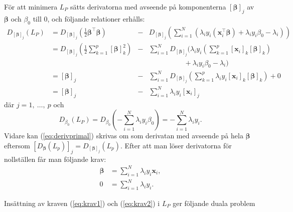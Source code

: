 \documentclass[a4paper, 12pt]{report}
\theoremstyle{definition}
\theoremstyle{remark}
\newcommand{\bfbeta}{{\boldsymbol{\beta}}}
\newcommand{\bfx}{\mathbf{x}}
\begin{document}
För att minimera $L_P$ sätts derivatorna med avseende på komponenterna $\left[\bfbeta\right]_j$ av $\bfbeta$ och $\beta_0$ till 0, och följande relationer erhålls:
\begin{equation}\label{eq:derivprimal}
\begin{aligned}
	D_{ \left[\bfbeta\right]_j } \left(L_P\right) &= D_{ \left[\bfbeta\right]_j } \left( \frac{1}{2} \bfbeta^\intercal \bfbeta \right) &- &D_{ \left[\bfbeta\right]_j } \left( \sum_{i=1}^{N} \left( \lambda_i y_i \left( \bfx_i^\intercal\bfbeta \right) + \lambda_i y_i \beta_0 - \lambda_i \right)\right)\\
	&= D_{ \left[\bfbeta\right]_j } \left( \frac{1}{2} \sum_{k=1}^{p} \left[\bfbeta\right]_k^2 \right)
	&- &\sum_{i=1}^{N} D_{ \left[\bfbeta\right]_j }
	\Big(  \lambda_i y_i \left( \sum_{k=1}^{p} \left[\mathbf{x}_i\right]_k \left[ \bfbeta \right]_k \right)\\
	& & &\qquad\qquad\quad+ \lambda_i y_i \beta_0-\lambda_i \Big)\\
	&= [\bfbeta]_j &- &\sum_{i=1}^{N} D_{ \left[\bfbeta\right]_j } \left( \sum_{k=1}^{p} \lambda_i y_i \left[\mathbf{x}_i\right]_k\left[\bfbeta\right]_k \right) + 0\\
	&= [\bfbeta]_j &- &\sum_{i=1}^{N}\lambda_i y_i \left[ \mathbf{x}_i \right]_j
\end{aligned}
\end{equation}
där $j=1,~\dots,~p$ och
\begin{equation*}
	D_{\beta_0}\left(L_P\right) = D_{\beta_0}\left( -\sum_{i=1}^{N} \lambda_i y_i \beta_0 \right) = -\sum_{i=1}^{N} \lambda_i y_i.
\end{equation*}
Vidare kan (\ref{eq:derivprimal}) skrivas om som derivatan med avseende på hela $\bfbeta$ eftersom $ \left[ D_{ \bfbeta }\left(L_p\right) \right]_j = D_{\left[ \bfbeta \right]_j}\left(L_p\right) $. Efter att man löser derivatorna för nollställen får man följande krav:
\begin{align}\label{eq:krav1}
	\bfbeta &= \sum_{i=1}^{N} \lambda_i y_i \mathbf{x}_i,\\
	0 &= \sum_{i=1}^{N} \lambda_i y_i.\label{eq:krav2}
\end{align}

Insättning av kraven (\ref{eq:krav1}) och (\ref{eq:krav2}) i $L_P$ ger följande duala problem
\end{document}
